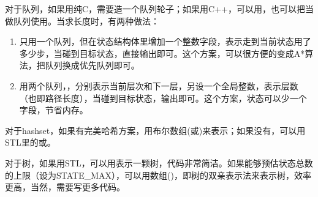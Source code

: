对于队列，如果用纯C，需要造一个队列轮子；如果用C++，可以用，也可以把当做队列使用。当求长度时，有两种做法：
\begin{enumerate}
\item 只用一个队列，但在状态结构体里增加一个整数字段，表示走到当前状态用了多少步，当碰到目标状态，直接输出即可。这个方案，可以很方便的变成A*算法，把队列换成优先队列即可。
\item 用两个队列，，分别表示当前层次和下一层，另设一个全局整数，表示层数（也即路径长度），当碰到目标状态，输出即可。这个方案，状态可以少一个字段，节省内存。
\end{enumerate}

对于hashset，如果有完美哈希方案，用布尔数组(或)来表示；如果没有，可以用STL里的或。

对于树，如果用STL，可以用表示一颗树，代码非常简洁。如果能够预估状态总数的上限（设为STATE_MAX），可以用数组()，即树的双亲表示法来表示树，效率更高，当然，需要写更多代码。


